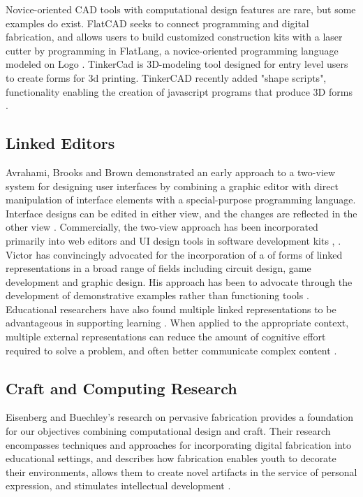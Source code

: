 \documentclass{sigchi}
\begin{document}
Novice-oriented CAD tools with computational design features are rare, but some examples do exist. FlatCAD seeks to connect programming and digital fabrication, and allows users to build customized construction kits with a laser cutter by programming in FlatLang, a novice-oriented programming language modeled on Logo \cite{flatcad}. TinkerCad is 3D-modeling tool designed for entry level users to create forms for 3d printing. TinkerCAD recently added "shape scripts", functionality enabling the creation of javascript programs that produce 3D forms \cite{tinkercad}.

\subsection{Linked Editors}
Avrahami, Brooks and Brown demonstrated an early approach to a two-view system for designing user interfaces by combining a graphic editor with direct manipulation of interface elements with a special-purpose programming language. Interface designs can be edited in either view, and the changes are reflected in the other view \cite{two_view_ui}. Commercially, the two-view approach has been incorporated primarily into web editors \cite{dreamweaver}and UI design tools in software development kits \cite{eclipse}, \cite{something else}. Victor has convincingly advocated for the incorporation of a of forms of linked representations in a broad range of fields including circuit design, game development and graphic design. His approach has been to advocate through the development of demonstrative examples rather than functioning tools \cite{victor}. Educational researchers have also found multiple linked representations to be advantageous in supporting learning \cite{white}. When applied to the appropriate context, multiple external representations can reduce the amount of cognitive effort required to solve a problem, and often better communicate complex content \cite{ainsworth}.

\subsection{Craft and Computing Research}
Eisenberg and Buechley's research on pervasive fabrication provides a foundation for our objectives combining computational design and craft. Their research encompasses techniques and approaches for incorporating digital fabrication into educational settings, and describes how fabrication enables youth to decorate their environments, allows them to create novel artifacts in the service of personal expression, and stimulates intellectual development \cite{pervasive_fab}. 
\end{document}
